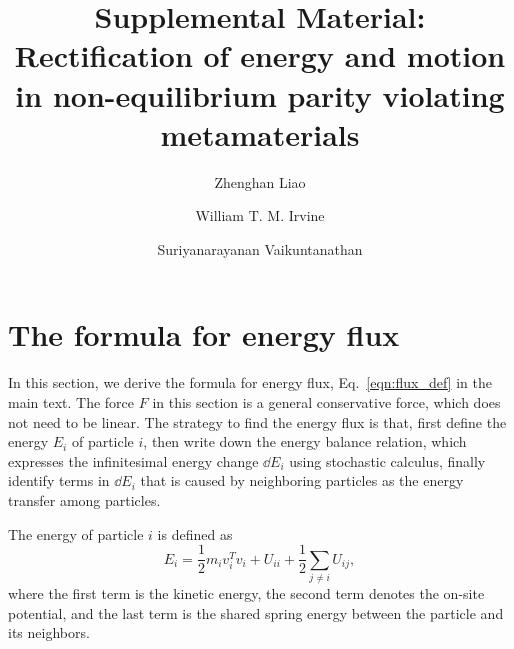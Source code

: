 \documentclass[
 amsmath,amssymb,
 aps,
 pre,
 longbibliography,
 10pt, onecolumn,
 notitlepage
]{revtex4-1}
\begin{document}
\newcommand{\eqnname}{Eq.}
\newcommand{\secname}{Sec.}
\renewcommand{\theequation}{S\arabic{equation}}
\renewcommand{\thefigure}{S\arabic{figure}}
\renewcommand{\bibnumfmt}[1]{[S#1]}
\renewcommand{\citenumfont}[1]{S#1}


\title{Supplemental Material: Rectification of energy and motion in non-equilibrium parity violating metamaterials}


\author{Zhenghan Liao}
\author{William T. M. Irvine}
\author{Suriyanarayanan Vaikuntanathan}


\maketitle


\section{The formula for energy flux}
In this section, we derive the formula for energy flux, \eqnname~\eqref{eqn:flux_def} in the main text.
The force $F$ in this section is a general conservative force, which does not need to be linear.
The strategy to find the energy flux is that, first define the energy $E_i$ of particle $i$, then write down the energy balance relation, which expresses the infinitesimal energy change $\dd E_i$ using stochastic calculus, finally identify terms in $\dd E_i$ that is caused by neighboring particles as the energy transfer among particles.

The energy of particle $i$ is defined as
\begin{equation} \label{eqnS:energy_individual}
E_i = \frac{1}{2}m_iv_i^Tv_i + U_{ii} + \frac{1}{2}\sum_{j\neq i}U_{ij},
\end{equation}
where the first term is the kinetic energy, the second term denotes the on-site potential, and the last term is the shared spring energy between the particle and its neighbors.
\end{document}
